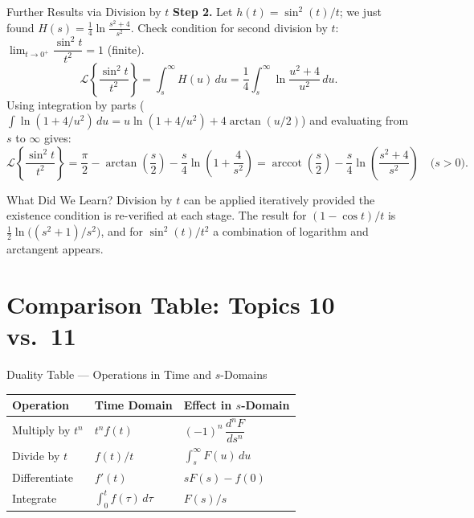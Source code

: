 \documentclass[12pt,a4paper]{article}
\begin{document}
\begin{infobox}{Further Results via Division by $t$}
\textbf{Step 2.} Let $h(t)=\sin^2(t)/t$; we just found
$H(s)=\frac{1}{4}\ln\frac{s^2+4}{s^2}$.
Check condition for second division by $t$:
$\lim_{t\to 0^+}\dfrac{\sin^2 t}{t^2} = 1$ (finite). \checkmark
\[
  \mathcal{L}\!\left\{\frac{\sin^2 t}{t^2}\right\}
  = \int_s^\infty H(u)\,du
  = \frac{1}{4}\int_s^\infty \ln\frac{u^2+4}{u^2}\,du.
\]
Using integration by parts ($\int \ln(1+4/u^2)\,du = u\ln(1+4/u^2) + 4\arctan(u/2)$) and evaluating from $s$ to $\infty$ gives:
\[
  \mathcal{L}\!\left\{\frac{\sin^2 t}{t^2}\right\}
  = \frac{\pi}{2} - \arctan\!\left(\frac{s}{2}\right) - \frac{s}{4}\ln\!\left(1+\frac{4}{s^2}\right)
  = \operatorname{arccot}\!\left(\frac{s}{2}\right) - \frac{s}{4}\ln\!\left(\frac{s^2+4}{s^2}\right)
    \quad\bigl(s>0\bigr).
\]
\end{infobox}

\begin{learnbox}{What Did We Learn?}
Division by $t$ can be applied iteratively provided the existence condition
is re-verified at each stage. The result for $(1-\cos t)/t$ is
$\frac{1}{2}\ln\!\bigl((s^2+1)/s^2\bigr)$, and for $\sin^2(t)/t^2$ a
combination of logarithm and arctangent appears.
\end{learnbox}

\section{Comparison Table: Topics 10 vs.\ 11}

\begin{infobox}{Duality Table --- Operations in Time and $s$-Domains}
\begin{center}
\begin{tabular}{@{}llp{5.5cm}@{}}
\toprule
\textbf{Operation} & \textbf{Time Domain} & \textbf{Effect in $s$-Domain} \\
\midrule
Multiply by $t^n$ & $t^n f(t)$ & $(-1)^n\,\dfrac{d^n F}{ds^n}$ \\[6pt]
Divide by $t$     & $f(t)/t$   & $\displaystyle\int_s^\infty F(u)\,du$ \\[6pt]
Differentiate     & $f'(t)$    & $sF(s)-f(0)$ \\[6pt]
Integrate         & $\displaystyle\int_0^t f(\tau)\,d\tau$ & $F(s)/s$ \\
\bottomrule
\end{tabular}
\end{center}
\end{infobox}
\end{document}
